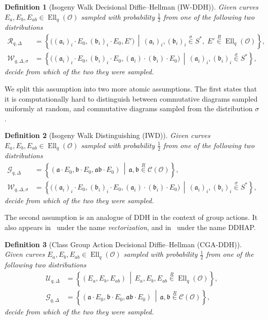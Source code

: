 \documentclass{article}
\newcommand{\Cl}{\mathcal{C}}
\renewcommand{\O}{\mathcal{O}}
\newcommand{\suchthat}{\,\middle\vert\,}
\renewcommand{\frak}{\mathfrak}
\newcommand{\rand}[1]{\overset{#1}{∈}}
\newcommand{\uni}{\rand{R}}
\newtheorem{definition}{Definition}[section]
\theoremstyle{definition}
\DeclareMathOperator{\Ell}{Ell}
\begin{document}
\begin{definition}[Isogeny Walk Decisional Diffie--Hellman (IW-DDH)]
  Given curves $E_a,E_b,E_{ab}∈\Ell_q(\O)$ sampled with probability
  $\frac{1}{2}$ from one of the following two distributions
  \begin{align*}
    \mathcal{R}_{q,Δ} &= \left\{\bigl((\frak a_i)_i·E_0,(\frak b_i)_i·E_0,E'\bigr) \suchthat
                        (\frak a_i)_i,(\frak b_i)_i\rand{σ}S^*,\;
                        E'\uni\Ell_q(\O)\right\},\\
    \mathcal{W}_{q,Δ,σ} &= \left\{\bigl((\frak a_i)_i·E_0,(\frak b_i)_i·E_0,(\frak a_i)·(\frak b_i)·E_0\bigr) \suchthat
                          (\frak a_i)_i,(\frak b_i)_i\rand{σ}S^*\right\},
  \end{align*}
  decide from which of the two they were sampled.
\end{definition}

We split this assumption into two more atomic assumptions. The first
states that it is computationally hard to distinguish between
commutative diagrams sampled uniformly at random, and commutative
diagrams sampled from the distribution $σ$.

\begin{definition}[Isogeny Walk Distinguishing (IWD)]
  Given curves $E_a,E_b,E_{ab}∈\Ell_q(\O)$ sampled with probability
  $\frac{1}{2}$ from one of the following two distributions
  \begin{align*}
    \mathcal{G}_{q,Δ} &= \left\{(\frak a·E_0,\frak b·E_0,\frak{ab}·E_0) \suchthat
                        \frak a,\frak b\uni\Cl(\O)\right\},\\
    \mathcal{W}_{q,Δ,σ} &= \left\{\bigl((\frak a_i)_i·E_0,(\frak b_i)_i·E_0,(\frak a_i)·(\frak b_i)·E_0\bigr) \suchthat
                          (\frak a_i)_i,(\frak b_i)_i\rand{σ}S^*\right\},
  \end{align*}
  decide from which of the two they were sampled.
\end{definition}

The second assumption is an analogue of DDH in the context of group
actions. It also appears in~\cite{cryptoeprint:2006:291} under the
name \emph{vectorization}, and in~\cite{Stol,Stolbunov2012} under the
name DDHAP.
 
\begin{definition}[Class Group Action Decisional Diffie--Hellman (CGA-DDH)]
  Given curves $E_a,E_b,E_{ab}∈\Ell_q(\O)$ sampled with probability
  $\frac{1}{2}$ from one of the following two distributions
  \begin{align*}
    \mathcal{U}_{q,Δ} &= \left\{(E_a,E_b,E_{ab}) \suchthat E_a,E_b,E_{ab}\uni\Ell_q(\O)\right\},\\
    \mathcal{G}_{q,Δ} &= \left\{(\frak a·E_0,\frak b·E_0,\frak{ab}·E_0) \suchthat
                        \frak a,\frak b\uni\Cl(\O)\right\},
  \end{align*}
  decide from which of the two they were sampled.
\end{definition}
\end{document}

